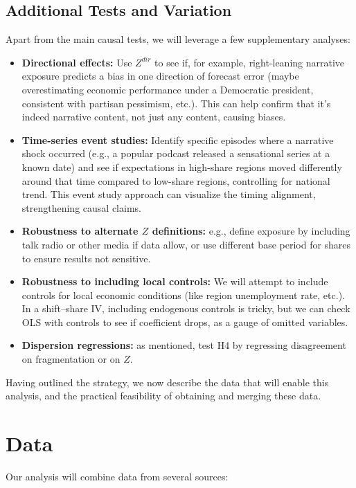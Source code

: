 \documentclass[12pt]{article}
\begin{document}
\subsection{Additional Tests and Variation}
Apart from the main causal tests, we will leverage a few supplementary analyses: \begin{itemize} \item \textbf{Directional effects:} Use $Z^{dir}$ to see if, for example, right-leaning narrative exposure predicts a bias in one direction of forecast error (maybe overestimating economic performance under a Democratic president, consistent with partisan pessimism, etc.). This can help confirm that it's indeed narrative content, not just any content, causing biases. \item \textbf{Time-series event studies:} Identify specific episodes where a narrative shock occurred (e.g., a popular podcast released a sensational series at a known date) and see if expectations in high-share regions moved differently around that time compared to low-share regions, controlling for national trend. This event study approach can visualize the timing alignment, strengthening causal claims. \item \textbf{Robustness to alternate $Z$ definitions:} e.g., define exposure by including talk radio or other media if data allow, or use different base period for shares to ensure results not sensitive. \item \textbf{Robustness to including local controls:} We will attempt to include controls for local economic conditions (like region unemployment rate, etc.). In a shift–share IV, including endogenous controls is tricky, but we can check OLS with controls to see if coefficient drops, as a gauge of omitted variables. \item \textbf{Dispersion regressions:} as mentioned, test H4 by regressing disagreement on fragmentation or on $Z$. \end{itemize}
Having outlined the strategy, we now describe the data that will enable this analysis, and the practical feasibility of obtaining and merging these data.
\section{Data}
Our analysis will combine data from several sources:
\end{document}
